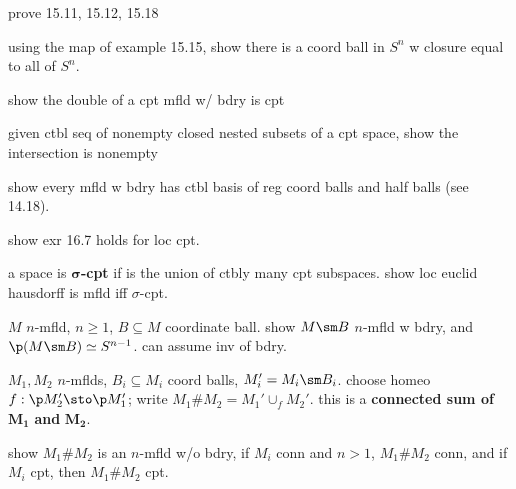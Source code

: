 
\begin{exr}[source=Primary Source Material]
    prove 15.11, 15.12, 15.18
\end{exr}

\begin{exr}[source=Primary Source Material]
    using the map of example 15.15, show there is a coord ball in $S^{n}$
    w closure equal to all of $S^{n}$.
\end{exr}

\begin{exr}[source=Primary Source Material]
    show the double of a cpt mfld w/ bdry is cpt
\end{exr}

\begin{exr}[source=Primary Source Material]
    given ctbl seq of nonempty closed nested subsets of a cpt space,
    show the intersection is nonempty
\end{exr}

\begin{exr}[source=Primary Source Material]
    show every mfld w bdry has ctbl basis of reg coord balls and half balls
    (see 14.18).
\end{exr}


\begin{exr}[source=Primary Source Material]
    show exr 16.7 holds for loc cpt.
\end{exr}

\begin{exr}[source=Primary Source Material]
    a space is $\bm{\sigma}$\textbf{-cpt} if is the union of ctbly many cpt
    subspaces.
    show loc euclid hausdorff is mfld iff $\sigma$-cpt.
\end{exr}

\newpage
\begin{exr}[source=Primary Source Material]
    $M$ $n$-mfld, $n\geq1$, $B\subseteq M$ coordinate ball.
    show $M\sm B$ $n$-mfld w bdry, and $\p(M\sm B)\simeq S^{n-1}$.
    can assume inv of bdry.
\end{exr}

\begin{exr}[source=Primary Source Material]
    $M_{1},M_{2}$ $n$-mflds, $B_{i}\subseteq M_{i}$ coord balls,
    $M_{i}'=M_{i}\sm B_{i}$.
    choose homeo $f:\p M_{2}'\sto\p M_{1}'$;
    write $M_{1}\#M_{2}=M_{1}'\cup_{f}M_{2}'$.
    this is a \textbf{connected sum of} $\bm{M_{1}}$ \textbf{and} $\bm{M_{2}}$.

    show $M_{1}\#M_{2}$ is an $n$-mfld w/o bdry,
    if $M_{i}$ conn and $n>1$, $M_{1}\#M_{2}$ conn, and
    if $M_{i}$ cpt, then $M_{1}\#M_{2}$ cpt.
\end{exr}

